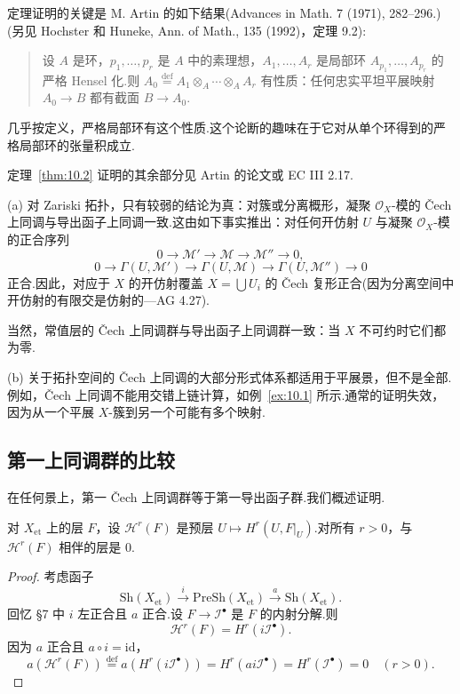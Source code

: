 定理证明的关键是 M. Artin 的如下结果(Advances in Math. 7 (1971), 282--296.)(另见 Hochster 和 Huneke, Ann. of Math., 135 (1992)，定理 9.2):

\begin{quote}
设 $A$ 是环，$p_1, \ldots, p_r$ 是 $A$ 中的素理想，$A_1, \ldots, A_r$ 是局部环 $A_{p_1}, \ldots, A_{p_r}$ 的严格 Hensel 化.则 $A_0 \overset{\mathrm{def}}{=} A_1 \otimes_{A} \cdots \otimes_{A} A_r$ 有性质：任何忠实平坦平展映射 $A_0 \to B$ 都有截面 $B \to A_0$.
\end{quote}

几乎按定义，严格局部环有这个性质.这个论断的趣味在于它对从单个环得到的严格局部环的张量积成立.

定理~\ref{thm:10.2} 证明的其余部分见 Artin 的论文或 EC III 2.17.

\begin{remark}\label{rem:10.3}
(a) 对 Zariski 拓扑，只有较弱的结论为真：对簇或分离概形，凝聚 $\mathcal{O}_X$-模的 \v{C}ech 上同调与导出函子上同调一致.这由如下事实推出：对任何开仿射 $U$ 与凝聚 $\mathcal{O}_X$-模的正合序列
\[
0 \to \mathcal{M}' \to \mathcal{M} \to \mathcal{M}'' \to 0,
\]
\[
0 \to \Gamma(U, \mathcal{M}') \to \Gamma(U, \mathcal{M}) \to \Gamma(U, \mathcal{M}'') \to 0
\]
正合.因此，对应于 $X$ 的开仿射覆盖 $X = \bigcup U_i$ 的 \v{C}ech 复形正合(因为分离空间中开仿射的有限交是仿射的---AG 4.27).

当然，常值层的 \v{C}ech 上同调群与导出函子上同调群一致：当 $X$ 不可约时它们都为零.

(b) 关于拓扑空间的 \v{C}ech 上同调的大部分形式体系都适用于平展景，但不是全部.例如，\v{C}ech 上同调不能用交错上链计算，如例~\ref{ex:10.1} 所示.通常的证明失效，因为从一个平展 $X$-簇到另一个可能有多个映射.
\end{remark}

\subsection*{第一上同调群的比较}

在任何景上，第一 \v{C}ech 上同调群等于第一导出函子群.我们概述证明.

\begin{proposition}\label{prop:10.4}
对 $X_{\mathrm{et}}$ 上的层 $F$，设 $\mathcal{H}^{r}(F)$ 是预层 $U \mapsto H^{r}(U, F|_{U})$.对所有 $r > 0$，与 $\mathcal{H}^{r}(F)$ 相伴的层是 0.
\end{proposition}

\begin{proof}
考虑函子
\[
\mathrm{Sh}(X_{\mathrm{et}}) \xrightarrow{i} \mathrm{PreSh}(X_{\mathrm{et}}) \xrightarrow{a} \mathrm{Sh}(X_{\mathrm{et}}).
\]
回忆 \S 7 中 $i$ 左正合且 $a$ 正合.设 $F \to \mathcal{I}^{\bullet}$ 是 $F$ 的内射分解.则
\[
\mathcal{H}^{r}(F) = H^{r}(i\mathcal{I}^{\bullet}).
\]
因为 $a$ 正合且 $a \circ i = \mathrm{id}$，
\[
a(\mathcal{H}^{r}(F)) \overset{\mathrm{def}}{=} a(H^{r}(i\mathcal{I}^{\bullet})) = H^{r}(ai\mathcal{I}^{\bullet}) = H^{r}(\mathcal{I}^{\bullet}) = 0 \quad (r > 0).
\]
\end{proof}

